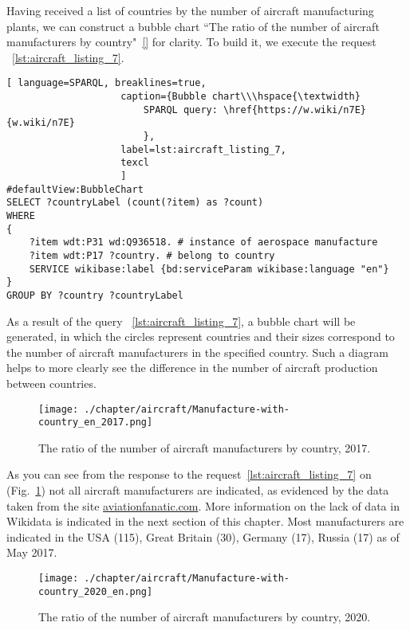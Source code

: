Having received a list of countries by the number of aircraft manufacturing plants, we can construct a bubble chart 
``The ratio of the number of aircraft manufacturers by country"~\ref{} for clarity. To build it, we execute the request ~\ref{lst:aircraft_listing_7}.

\begin{lstlisting}[ language=SPARQL, breaklines=true, 
                    caption={Bubble chart\\\hspace{\textwidth}
                        SPARQL query: \href{https://w.wiki/n7E}{w.wiki/n7E}
                        },
                    label=lst:aircraft_listing_7,
                    texcl 
                    ]
#defaultView:BubbleChart
SELECT ?countryLabel (count(?item) as ?count)
WHERE
{
    ?item wdt:P31 wd:Q936518. # instance of aerospace manufacture
  	?item wdt:P17 ?country. # belong to country
    SERVICE wikibase:label {bd:serviceParam wikibase:language "en"}
}
GROUP BY ?country ?countryLabel
\end{lstlisting}

As a result of the query ~\ref{lst:aircraft_listing_7}, a bubble chart will be generated, in which the circles represent countries and their 
sizes correspond to the number of aircraft manufacturers in the specified country. Such a diagram helps to more clearly see the difference 
in the number of aircraft production between countries.

\begin{figure}[h!]
\centering
	\texttt{[image: ./chapter/aircraft/Manufacture-with-country\_en\_2017.png]}
	\caption{The ratio of the number of aircraft manufacturers by country, 2017.}
	\label{fig:Manufacture-with-country_en_2017}
\end{figure}

As you can see from the response to the request~\ref{lst:aircraft_listing_7} on (Fig.~\ref{fig:Manufacture-with-country_en_2017}) not all 
aircraft manufacturers are indicated, as evidenced by the data taken from the site \href{https://www.aviationfanatic.com/}{aviationfanatic.com}. 
More information on the lack of data in Wikidata is indicated in the next section of this chapter. Most manufacturers are indicated in the 
USA (115), Great Britain (30), Germany (17), Russia (17) as of May 2017.

\begin{figure}[h!]
\centering
	\texttt{[image: ./chapter/aircraft/Manufacture-with-country\_2020\_en.png]}
	\caption{The ratio of the number of aircraft manufacturers by country, 2020.}
	\label{fig:Manufacture-with-country_2020_en}
\end{figure}


